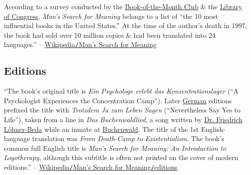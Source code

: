 \documentclass[oneside]{book}
\numberwithin{equation}{section}
\begin{document}
According to a survey conducted by the \href{https://en.wikipedia.org/wiki/Book-of-the-Month_Club}{Book-of-the-Month Club} \& the \href{https://en.wikipedia.org/wiki/Library_of_Congress}{Library of Congress}, \textit{Man's Search for Meaning} belongs to a list of ``the 10 most influential books in the United States.'' At the time of the author's death in 1997, the book had sold over 10 million copies \& had been translated into 24 languages.'' -- \href{https://en.wikipedia.org/wiki/Man%27s_Search_for_Meaning}{Wikipedia\texttt{/}Man's Search for Meaning}

\subsection{Editions}
``The book's original title is \textit{Ein Psychologe erlebt das Konzentrationslager} (``A Psychologist Experiences the Concentration Camp''). Later \href{https://en.wikipedia.org/wiki/German_language}{German} editions prefixed the title with \textit{Trotzdem Ja zum Leben Sagen} (``Nevertheless Say Yes to Life''), taken from a line in \textit{Das Buchenwaldlied}, a song written by \href{https://en.wikipedia.org/wiki/Fritz_L%C3%B6hner-Beda}{Dr. Friedrich L\"ohner-Beda} while an inmate at \href{https://en.wikipedia.org/wiki/Buchenwald_concentration_camp}{Buchenwald}. The title of the 1st English-language translation was \textit{From Death-Camp to Existentialism}. The book's common full English title is \textit{Man's Search for Meaning: An Introduction to Logotherapy}, although this subtitle is often not printed on the cover of modern editions.'' -- \href{https://en.wikipedia.org/wiki/Man%27s_Search_for_Meaning#Editions}{Wikipedia\texttt{/}Man's Search for Meaning\texttt{/}editions}
\end{document}
